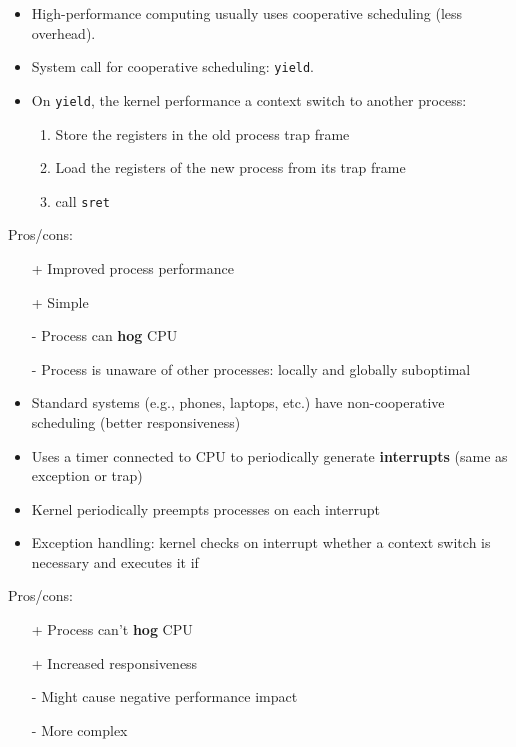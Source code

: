 \begin{itemize}
    \item High-performance computing usually uses cooperative scheduling (less overhead).
    \item System call for cooperative scheduling: \texttt{yield}.
    \item On \texttt{yield}, the kernel performance a context switch to another process:
    \begin{enumerate}
        \item Store the registers in the old process trap frame
        \item Load the registers of the new process from its trap frame
        \item call \texttt{sret}
    \end{enumerate}
\end{itemize}
Pros/cons:
\begin{itemize}
    \item[+] Improved process performance
    \item[+] Simple
    \item[-] Process can \textbf{hog} CPU
    \item[-] Process is unaware of other processes: locally and globally suboptimal
\end{itemize}

\newpar{}
\begin{itemize}
    \item Standard systems (e.g., phones, laptops, etc.) have non-cooperative scheduling (better responsiveness)
    \item Uses a timer connected to CPU to periodically generate \textbf{interrupts} (same as exception or trap)
    \item Kernel periodically preempts processes on each interrupt
    \item Exception handling: kernel checks on interrupt whether a context switch is necessary and executes it if 
\end{itemize}
Pros/cons:
\begin{itemize}
    \item[+] Process can't \textbf{hog} CPU
    \item[+] Increased responsiveness
    \item[-] Might cause negative performance impact
    \item[-] More complex
\end{itemize}

